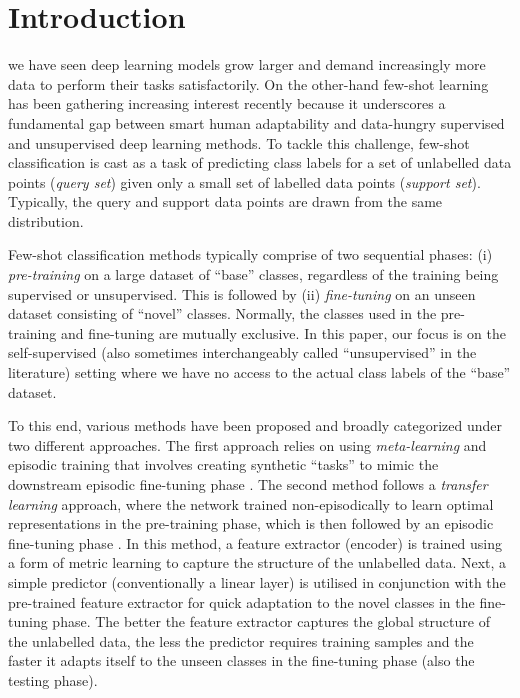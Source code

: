 \chapter{Introduction}\label{sec:intro}

 we have seen deep learning models grow larger and demand increasingly more data to perform their tasks satisfactorily. 
On the other-hand few-shot learning has been gathering increasing interest recently because it underscores a fundamental gap between smart human adaptability and data-hungry supervised and unsupervised deep learning methods. To tackle this challenge, few-shot classification is cast as a task of predicting class labels for a set of unlabelled data points (\textit{query set}) given only a small set of labelled data points (\textit{support set}). Typically, the query and support data points are drawn from the same distribution. 

Few-shot classification methods typically comprise of two sequential phases: (i) \textit{pre-training} on a large dataset of ``base'' classes, regardless of the training being supervised or unsupervised. This is followed by (ii) \textit{fine-tuning} on an unseen dataset consisting of ``novel'' classes. Normally, the classes used in the pre-training and fine-tuning are mutually exclusive. In this paper, our focus is on the self-supervised (also sometimes interchangeably called ``unsupervised'' in the literature) setting where we have no access to the actual class labels of the ``base'' dataset.

To this end, various methods have been proposed and broadly categorized under two different approaches. The first approach relies on using \textit{meta-learning} and episodic training that involves creating synthetic ``tasks'' to mimic the downstream episodic fine-tuning phase \parencite{Finn2017Model-agnosticNetworks, Hsu2018UnsupervisedMeta-Learning, Khodadadeh2018UnsupervisedClassification, Antoniou2019AssumeAugmentation, Ye2022, lee2021meta, Ji2019UnsupervisedTraining}. 
The second method follows a \textit{transfer learning} approach, where the network trained non-episodically to learn optimal representations in the pre-training phase, which is then followed by an episodic fine-tuning phase \parencite{Medina2020Self-SupervisedClassification, goodemballneed2020, dhillon2019baseline}.
In this method, a feature extractor (encoder) is trained using a form of metric learning to capture the structure of the unlabelled data. 
Next, a simple predictor (conventionally a linear layer) is utilised in conjunction with the pre-trained feature extractor for quick adaptation to the novel classes in the fine-tuning phase.
The better the feature extractor captures the global structure of the unlabelled data, the less the predictor requires training samples and the faster it adapts itself to the unseen classes in the fine-tuning phase (also the testing phase).

